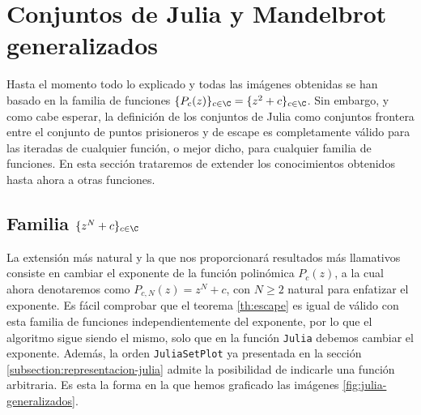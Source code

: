 \section{Conjuntos de Julia y Mandelbrot generalizados}

Hasta el momento todo lo explicado y todas las imágenes obtenidas se han basado en la familia de funciones $\{P_c(z)\}_{c\in\C}=\{z^2+c\}_{c\in\C}$. Sin embargo, y como cabe esperar, la definición de los conjuntos de Julia como conjuntos frontera entre el conjunto de puntos prisioneros y de escape es completamente válido para las iteradas de cualquier función, o mejor dicho, para cualquier familia de funciones. En esta sección trataremos de extender los conocimientos obtenidos hasta ahora a otras funciones.

\subsection{Familia $\{z^N+c\}_{c\in\C}$}

La extensión más natural y la que nos proporcionará resultados más llamativos consiste en cambiar el exponente de la función polinómica $P_c(z)$, a la cual ahora denotaremos como $P_{c,N}(z)=z^N+c$, con $N\geq 2$ natural para enfatizar el exponente. Es fácil comprobar que el teorema \ref{th:escape} es igual de válido con esta familia de funciones independientemente del exponente, por lo que el algoritmo sigue siendo el mismo, solo que en la función \verb|Julia| debemos cambiar el exponente. Además, la orden \verb|JuliaSetPlot| ya presentada en la sección \ref{subsection:representacion-julia} admite la posibilidad de indicarle una función arbitraria. Es esta la forma en la que hemos graficado las imágenes \ref{fig:julia-generalizados}.

